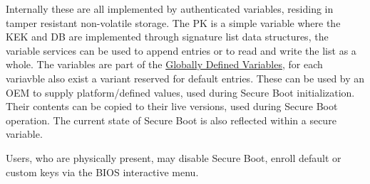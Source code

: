 Internally these are all implemented by authenticated variables, residing in tamper resistant non-volatile storage\cite[32.3]{uefi-spec}.
The \ac{PK} is a simple variable where the \ac{KEK} and \ac{DB} are implemented through signature list data structures\cite[32.4.1]{uefi-spec}, the variable services can be used to append entries or to read and write the list as a whole\cite[32.3.5 and 32.5.3]{uefi-spec}.
The variables are part of the \hyperref[sec:uefi-pi:uefi:variables]{Globally Defined Variables}, for each variavble also exist a variant reserved for default entries. These can be used by an \ac{OEM} to supply platform\-/defined values, used during Secure Boot initialization.
Their contents can be copied to their live versions, used during Secure Boot operation.
The current state of Secure Boot is also reflected within a secure variable\cite[3.3]{uefi-spec}.

Users, who are physically present, may disable Secure Boot, enroll default or custom keys via the \ac{BIOS} interactive menu. 

\cite[32.5.3.2]{uefi-spec}


